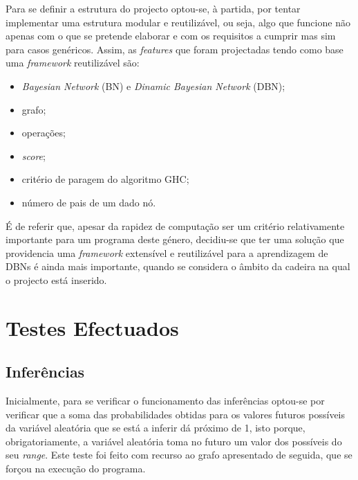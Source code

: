 \documentclass[10pt]{article}
\numberwithin{equation}{section}
\begin{document}
Para se definir a estrutura do projecto optou-se, à partida, por tentar implementar uma estrutura modular e reutilizável, ou seja, algo que funcione não apenas com o que se pretende elaborar e com os requisitos a cumprir mas sim para casos genéricos. Assim, as \textit{features} que foram projectadas tendo como base uma \textit{framework} reutilizável são:

\begin{itemize}
	\item \textit{Bayesian Network} (BN) e \textit{Dinamic Bayesian Network} (DBN);
	\vspace{-2.5mm}
	\item grafo;
	\vspace{-2.5mm}
	\item operações; 
	\vspace{-2.5mm}
	\item \textit{score};
	\vspace{-2.5mm}
	\item critério de paragem do algoritmo GHC;
	\vspace{-2.5mm}
	\item número de pais de um dado nó.
\end{itemize}

É de referir que, apesar da rapidez de computação ser um critério relativamente importante para um programa deste género, decidiu-se que ter uma solução que providencia uma \textit{framework} extensível e reutilizável para a aprendizagem de DBNs é ainda mais importante, quando se considera o âmbito da cadeira na qual o projecto está inserido.

\section{Testes Efectuados}

\subsection{Inferências}

Inicialmente, para se verificar o funcionamento das inferências optou-se por verificar que a soma das probabilidades obtidas para os valores futuros possíveis da variável aleatória que se está a inferir dá próximo de 1, isto porque, obrigatoriamente, a variável aleatória toma no futuro um valor dos possíveis do seu \textit{range}. Este teste foi feito com recurso ao grafo apresentado de seguida, que se forçou na execução do programa.
\end{document}
